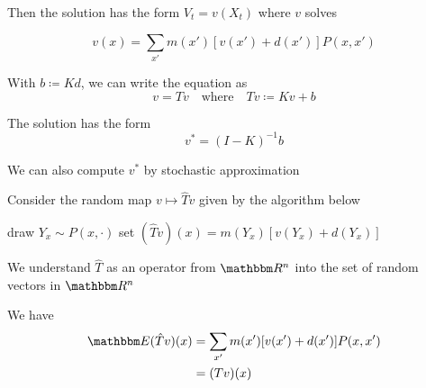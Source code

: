 \documentclass[xcolor=dvipsnames]{beamer}  %
\newcommand{\1}{\mathbbm 1}
\newcommand{\RR}{\mathbbm R}
\newcommand{\EE}{\mathbbm E}
\newcommand{\XX}{\mathsf X}
\begin{document}
\begin{frame}
    
    Then the solution has the form $V_t = v(X_t)$ where $v$ solves

    \begin{equation*}
        v(x) = \sum_{x'} m(x') [v(x') + d(x')]  P(x,x') 
    \end{equation*}

            \vspace{0.5em}
    With $b \coloneq Kd$, we can write the equation as 
    \begin{equation*}
        v = Tv 
        \quad \text{where} \quad
        Tv \coloneq Kv + b
    \end{equation*}

            \vspace{0.5em}
    The solution has the form
    \begin{equation*}
        v^* = (I - K)^{-1} b
    \end{equation*}

\end{frame}

\begin{frame}[fragile]
    
    We can also compute $v^*$ by stochastic approximation

    Consider the random map $v \mapsto \hat Tv$ given by
    the algorithm below

    \begin{algorithm}[H]
        \DontPrintSemicolon
        \For{$x \in \XX$}
        {
            draw $Y_x \sim P(x, \cdot)$ \;
            set $(\hat Tv)(x) = m(Y_x)[v(Y_x) + d(Y_x)]$
        }
    \end{algorithm}

    We understand $\hat T$ as an operator from $\RR^n$ into the set of random
    vectors in $\RR^n$
    
    We have
    \begin{align*}
        \EE (\hat Tv)(x) 
        & = \sum_{x'} m(x')[v(x') + d(x')] P(x, x')
        \\
        & = (Tv)(x)
    \end{align*}

\end{frame}
\end{document}

